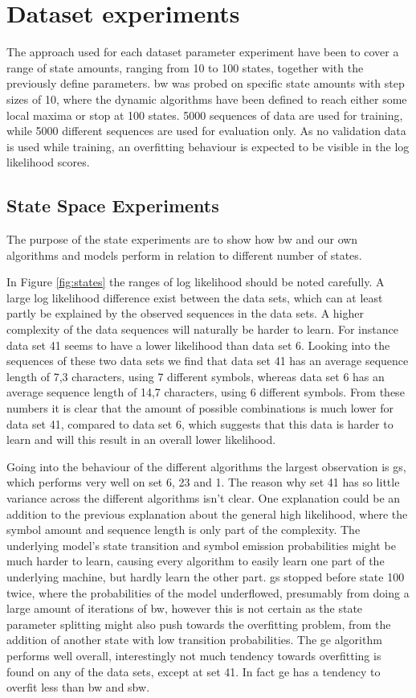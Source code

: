 \section{Dataset experiments}
\label{sec:dataset_experiments}
The approach used for each dataset parameter experiment have been to cover a range of state amounts, ranging from 10 to 100 states, together with the previously define parameters. \gls{bw} was probed on specific state amounts with step sizes of 10, where the dynamic algorithms have been defined to reach either some local maxima or stop at 100 states. 5000 sequences of data are used for training, while 5000 different sequences are used for evaluation only. As no validation data is used while training, an overfitting behaviour is expected to be visible in the log likelihood scores.

\subsection{State Space Experiments}

The purpose of the state experiments are to show how \gls{bw} and our own algorithms and models perform in relation to different number of states.

In Figure \ref{fig:states} the ranges of log likelihood should be noted carefully. A large log likelihood difference exist between the data sets, which can at least partly be explained by the observed sequences in the data sets. A higher complexity of the data sequences will naturally be harder to learn. For instance data set 41 seems to have a lower likelihood than data set 6. Looking into the sequences of these two data sets we find that data set 41 has an average sequence length of 7,3 characters, using 7 different symbols, whereas data set 6 has an average sequence length of 14,7 characters, using 6 different symbols. From these numbers it is clear that the amount of possible combinations is much lower for data set 41, compared to data set 6, which suggests that this data is harder to learn and will this result in an overall lower likelihood.

Going into the behaviour of the different algorithms the largest observation is \gls{gs}, which performs very well on set 6, 23 and 1. The reason why set 41 has so little variance across the different algorithms isn't clear. One explanation could be an addition to the previous explanation about the general high likelihood, where the symbol amount and sequence length is only part of the complexity. The underlying model's state transition and symbol emission probabilities might be much harder to learn, causing every algorithm to easily learn one part of the underlying machine, but hardly learn the other part. \gls{gs} stopped before state 100 twice, where the probabilities of the model underflowed, presumably from doing a large amount of iterations of \gls{bw}, however this is not certain as the state parameter splitting might also push towards the overfitting problem, from the addition of another state with low transition probabilities.
The \gls{ge} algorithm performs well overall, interestingly not much tendency towards overfitting is found on any of the data sets, except at set 41. In fact \gls{ge} has a tendency to overfit less than \gls{bw} and \gls{sbw}.


